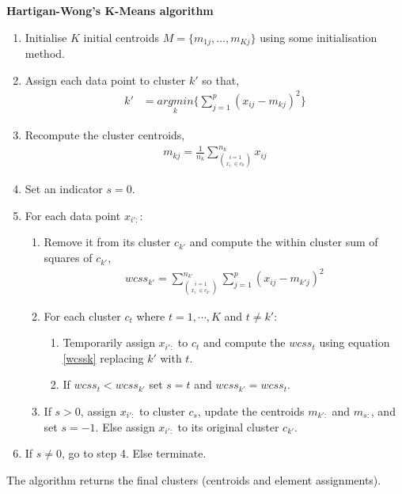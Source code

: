 \documentclass[12pt]{article}
\begin{document}
	\begin{center}
	\setlength\abovedisplayskip{0pt}
	\begin{tcolorbox}[breakable,colback=white!100!white,colframe=black!100!black]
		\noindent\textbf{Hartigan-Wong's K-Means algorithm}
		\begin{enumerate}
			\item Initialise $K$ initial centroids $M = \{m_{1j}, \dots, m_{Kj}\}$ using some initialisation method. 
			
			\item Assign each data point to cluster $k'$ so that,
			\begin{align}\nonumber
			k' &= \underset{k}{argmin}\bigg\{ \sum_{j=1}^{p} (x_{ij}-m_{kj})^2    \bigg\}
			\end{align}	
			
			\item Recompute the cluster centroids,
			\begin{align}\nonumber
			m_{kj} = \frac{1}{n_k}\sum_{\binom{i=1}{x_{i:} \in c_k}}^{n_k} x_{ij}
			\end{align}	
			
			\item Set an indicator $s=0$.		
			
			\item For each data point $x_{i':}$:
			
			\begin{enumerate}
				\item Remove it from its cluster $c_{k'}$ and compute the within cluster sum of squares of $c_{k'}$,
				\begin{align}\label{wcssk}
				wcss_{k'} = \sum_{\binom{i=1}{x_{i:} \in c_{k'}}}^{n_{k'}}\sum_{j=1}^{p} (x_{ij}-m_{k'j})^2
				\end{align}	
				
				\item For each cluster $c_{t}$ where $t = 1,\cdots, K$ and $t \neq k'$:
				
				\begin{enumerate}
					\item Temporarily assign $x_{i':}$ to $c_{t}$ and compute the $wcss_{t}$ using equation \ref{wcssk} replacing $k'$ with $t$.
					\item If $wcss_{t} < wcss_{k'}$ set $s=t$ and $wcss_{k'} = wcss_{t}$.
				\end{enumerate}
				
				\item If $s > 0$, assign $x_{i':}$ to cluster $c_s$, update the centroids $m_{k':}$ and $m_{s:}$, and set $s = -1$. Else assign $x_{i':}$ to its original cluster $c_{k'}$.
			\end{enumerate}
			
			\item If $s \neq 0$, go to step 4. Else terminate.
		\end{enumerate}	
		The algorithm returns the final clusters (centroids and element assignments).
	\end{tcolorbox}
\end{center}	
\end{document}
